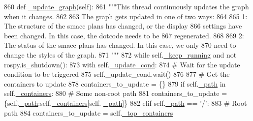 \begin{DoxyCode}
860     \textcolor{keyword}{def }\hyperlink{classsmacc__viewer_1_1SmaccViewerFrame_a35f35c81cd523594a190625c64baabb6}{\_update\_graph}(self):
861         \textcolor{stringliteral}{"""This thread continuously updates the graph when it changes.}
862 \textcolor{stringliteral}{}
863 \textcolor{stringliteral}{        The graph gets updated in one of two ways:}
864 \textcolor{stringliteral}{}
865 \textcolor{stringliteral}{          1: The structure of the smacc plans has changed, or the display}
866 \textcolor{stringliteral}{          settings have been changed. In this case, the dotcode needs to be}
867 \textcolor{stringliteral}{          regenerated. }
868 \textcolor{stringliteral}{}
869 \textcolor{stringliteral}{          2: The status of the smacc plans has changed. In this case, we only}
870 \textcolor{stringliteral}{          need to change the styles of the graph.}
871 \textcolor{stringliteral}{        """}
872         \textcolor{keywordflow}{while} self.\hyperlink{classsmacc__viewer_1_1SmaccViewerFrame_a20aa5e983200d5e77d659780d490d285}{\_keep\_running} \textcolor{keywordflow}{and} \textcolor{keywordflow}{not} rospy.is\_shutdown():
873             with self.\hyperlink{classsmacc__viewer_1_1SmaccViewerFrame_a87c1757aa21438ca8692b2f079b8f393}{\_update\_cond}:
874                 \textcolor{comment}{# Wait for the update condition to be triggered}
875                 self.\_update\_cond.wait()
876 
877                 \textcolor{comment}{# Get the containers to update}
878                 containers\_to\_update = \{\}
879                 \textcolor{keywordflow}{if} self.\hyperlink{classsmacc__viewer_1_1SmaccViewerFrame_a0e29b01e74edbb322f62e8ab6fdd359a}{\_path} \textcolor{keywordflow}{in} self.\hyperlink{classsmacc__viewer_1_1SmaccViewerFrame_a00ea07c6cc068340230dcac273ad5e90}{\_containers}:
880                     \textcolor{comment}{# Some non-root path}
881                     containers\_to\_update = \{self.\hyperlink{classsmacc__viewer_1_1SmaccViewerFrame_a0e29b01e74edbb322f62e8ab6fdd359a}{\_path}:self.\hyperlink{classsmacc__viewer_1_1SmaccViewerFrame_a00ea07c6cc068340230dcac273ad5e90}{\_containers}[self.
      \hyperlink{classsmacc__viewer_1_1SmaccViewerFrame_a0e29b01e74edbb322f62e8ab6fdd359a}{\_path}]\}
882                 \textcolor{keywordflow}{elif} self.\hyperlink{classsmacc__viewer_1_1SmaccViewerFrame_a0e29b01e74edbb322f62e8ab6fdd359a}{\_path} == \textcolor{stringliteral}{'/'}:
883                     \textcolor{comment}{# Root path}
884                     containers\_to\_update = self.\hyperlink{classsmacc__viewer_1_1SmaccViewerFrame_acc2f4310b3de2703026548d0d18387ea}{\_top\_containers}

\end{DoxyCode}
